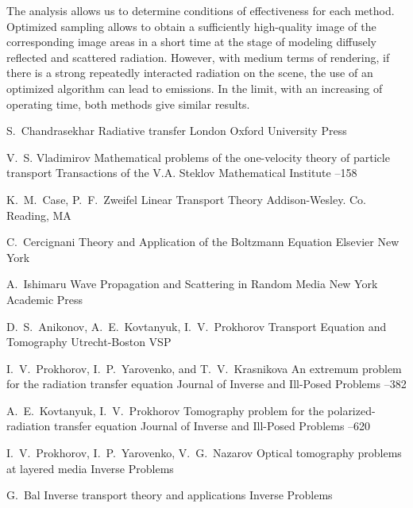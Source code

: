 \documentclass[12pt,reqno]{report}
\begin{document}
{The analysis allows us to determine conditions of effectiveness for each method. 
Optimized sampling allows to obtain a sufficiently high-quality image of the corresponding image areas in a short time 
at the stage of modeling diffusely reflected and scattered radiation. 
However, with medium terms of rendering, if there is a strong repeatedly interacted radiation 
on the scene, the use of an optimized algorithm can lead to emissions.
In the limit, with an increasing of operating time, both methods give similar results.



\begin{thebibliography}{1}

 \by  S.~Chandrasekhar \book  Radiative transfer \publaddr London \publ Oxford University Press 

 \by V.~S. Vladimirov  \paper Mathematical problems of the one-velocity theory of particle transport \jour  Transactions of the V.A. Steklov Mathematical Institute  
 --158


 \by K.~M.~Case, P.~F.~Zweifel \book Linear Transport Theory \publ 
Addison-Wesley. Co. Reading, MA 


 \by C.~Cercignani \book Theory and Application of the Boltzmann Equation \publ Elsevier \publaddr New York 

 \by  A.~Ishimaru \book  Wave Propagation and Scattering in 	Random Media \publaddr  New York \publ Academic Press 

 \by    D.~S.~Anikonov,   A.~E.~Kovtanyuk,    I.~V.~Prokhorov \book Transport
	Equation and Tomography \publaddr Utrecht-Boston \publ  VSP 

 \by   I.~V.~Prokhorov,   I.~P.~Yarovenko, and T.~V.~Krasnikova \paper An extremum problem for the radiation transfer
equation \jour Journal of Inverse and Ill-Posed Problems 
  --382

 \by A.~E.~Kovtanyuk, I.~V.~Prokhorov \paper Tomography problem for
the polarized-radiation transfer equation \jour  Journal of Inverse and Ill-Posed Problems    --620


\by I.~V.~Prokhorov, I.~P.~Yarovenko, V.~G.~Nazarov
\paper Optical tomography problems at layered media
\jour Inverse Problems

\by G.~Bal \paper Inverse transport theory and applications
\jour Inverse Problems     



\end{thebibliography}}
\end{document}
